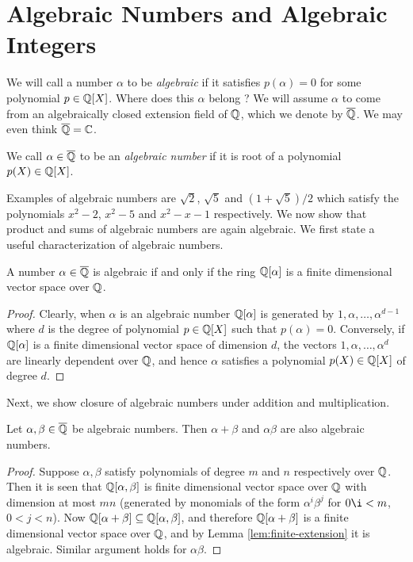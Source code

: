 \documentclass[11pt]{article}
\begin{document}
\section{Algebraic Numbers and Algebraic Integers}\label{sec:alg-numbers}
We will call a number $\alpha$ to be {\em algebraic} if it satisfies $p(\alpha)=0$ for some
polynomial $p\in \mathbb{Q}[X]$. Where does this $\alpha$ belong ? We will assume $\alpha$ to come from
an algebraically closed extension field of $\mathbb{Q}$, which we denote by $\overline{\mathbb{Q}}$. We may even
think $\overline{\mathbb{Q}}=\mathbb{C}$.

\begin{definition}\label{defn:alg-number}
We call $\alpha\in \overline{\mathbb{Q}}$ to be an {\em algebraic number} if it is root of a polynomial
$p(X)\in \mathbb{Q}[X]$.
\end{definition}
Examples of algebraic numbers are $\sqrt{2}$, $\sqrt{5}$ and $(1+\sqrt{5})/2$ which satisfy the polynomials
$x^2-2$, $x^2-5$ and $x^2-x-1$ respectively. We now show that product and sums of algebraic numbers are again
algebraic. We first state a useful characterization of algebraic numbers.

\begin{lemma}\label{lem:finite-extension}
A number $\alpha\in \overline{\mathbb{Q}}$ is algebraic if and only if the ring $\mathbb{Q}[\alpha]$ is a
finite dimensional vector space over $\mathbb{Q}$.
\end{lemma}
\begin{proof}
Clearly, when $\alpha$ is an algebraic number $\mathbb{Q}[\alpha]$ is generated by $1,\alpha,\ldots,\alpha^{d-1}$ where
$d$ is the degree of polynomial $p\in \mathbb{Q}[X]$ such that $p(\alpha)=0$.
Conversely, if $\mathbb{Q}[\alpha]$ is a finite dimensional vector space of dimension $d$, the vectors $1,\alpha,\ldots,
\alpha^d$ are linearly dependent over $\mathbb{Q}$, and hence $\alpha$ satisfies a polynomial $p(X)\in \mathbb{Q}[X]$ of degree
$d$.
\end{proof}

Next, we show closure of algebraic numbers under addition and multiplication.
\begin{lemma}\label{lem:alg-num-closed}
Let $\alpha,\beta\in \overline{\mathbb{Q}}$ be algebraic numbers. Then $\alpha+\beta$ and $\alpha\beta$ are also
algebraic numbers.
\end{lemma}
\begin{proof}
Suppose $\alpha,\beta$ satisfy polynomials of degree $m$ and $n$ respectively over $\mathbb{Q}$. Then it is seen that
$\mathbb{Q}[\alpha,\beta]$ is finite dimensional vector space over $\mathbb{Q}$ with dimension at most $mn$ (generated by
monomials of the form $\alpha^i\beta^j$ for $0\i<m$, $0<j<n$). Now $\mathbb{Q}[\alpha+\beta]\subseteq \mathbb{Q}[\alpha,\beta]$,
and therefore $\mathbb{Q}[\alpha+\beta]$ is a finite dimensional vector space over $\mathbb{Q}$, and by Lemma
\ref{lem:finite-extension} it is algebraic. Similar argument holds for $\alpha\beta$.
\end{proof}
\end{document}
